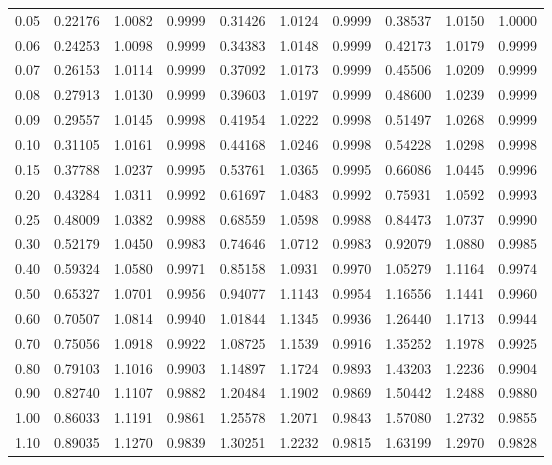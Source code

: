 {\begin{longtable}{|||d{3.2}|X|X|X|||}
0.05   & 0.22176  & 1.0082  & 0.9999  & 0.31426   & 1.0124  & 0.9999  & 0.38537  & 1.0150  & 1.0000 \\  
0.06   & 0.24253  & 1.0098  & 0.9999  & 0.34383   & 1.0148  & 0.9999  & 0.42173  & 1.0179  & 0.9999 \\   
0.07   & 0.26153  & 1.0114  & 0.9999  & 0.37092   & 1.0173  & 0.9999  & 0.45506  & 1.0209  & 0.9999 \\  
0.08   & 0.27913  & 1.0130  & 0.9999  & 0.39603   & 1.0197  & 0.9999  & 0.48600  & 1.0239  & 0.9999 \\  
0.09   & 0.29557  & 1.0145  & 0.9998  & 0.41954   & 1.0222  & 0.9998  & 0.51497  & 1.0268  & 0.9999 \\  
0.10   & 0.31105  & 1.0161  & 0.9998  & 0.44168   & 1.0246  & 0.9998  & 0.54228  & 1.0298  & 0.9998 \\[6pt]   
%
0.15   & 0.37788  & 1.0237  & 0.9995  & 0.53761   & 1.0365  & 0.9995  & 0.66086  & 1.0445  & 0.9996 \\*  
0.20   & 0.43284  & 1.0311  & 0.9992  & 0.61697   & 1.0483  & 0.9992  & 0.75931  & 1.0592  & 0.9993 \\  
0.25   & 0.48009  & 1.0382  & 0.9988  & 0.68559   & 1.0598  & 0.9988  & 0.84473  & 1.0737  & 0.9990 \\  
0.30   & 0.52179  & 1.0450  & 0.9983  & 0.74646   & 1.0712  & 0.9983  & 0.92079  & 1.0880  & 0.9985 \\  
0.40   & 0.59324  & 1.0580  & 0.9971  & 0.85158   & 1.0931  & 0.9970  & 1.05279  & 1.1164  & 0.9974 \\  
0.50   & 0.65327  & 1.0701  & 0.9956  & 0.94077   & 1.1143  & 0.9954  & 1.16556  & 1.1441  & 0.9960 \\ 
0.60   & 0.70507  & 1.0814  & 0.9940  & 1.01844   & 1.1345  & 0.9936  & 1.26440  & 1.1713  & 0.9944 \\  
0.70   & 0.75056  & 1.0918  & 0.9922  & 1.08725   & 1.1539  & 0.9916  & 1.35252  & 1.1978  & 0.9925 \\  
0.80   & 0.79103  & 1.1016  & 0.9903  & 1.14897   & 1.1724  & 0.9893  & 1.43203  & 1.2236  & 0.9904 \\  
0.90   & 0.82740  & 1.1107  & 0.9882  & 1.20484   & 1.1902  & 0.9869  & 1.50442  & 1.2488  & 0.9880 \\[6pt]  
%
1.00   & 0.86033  & 1.1191  & 0.9861  & 1.25578   & 1.2071  & 0.9843  & 1.57080  & 1.2732  & 0.9855 \\* 
1.10   & 0.89035  & 1.1270  & 0.9839  & 1.30251   & 1.2232  & 0.9815  & 1.63199  & 1.2970  & 0.9828 \\  

\end{longtable}}

